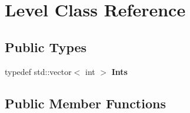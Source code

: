 \hypertarget{class_level}{\section{Level Class Reference}
\label{class_level}
}
\subsection*{Public Types}
\begin{DoxyCompactItemize}
\item 
\hypertarget{class_level_abdb7997d6b026545c865baa7281b79c7}{typedef std\-::vector$<$ int $>$ {\bfseries Ints}}\label{class_level_abdb7997d6b026545c865baa7281b79c7}

\end{DoxyCompactItemize}
\subsection*{Public Member Functions}
